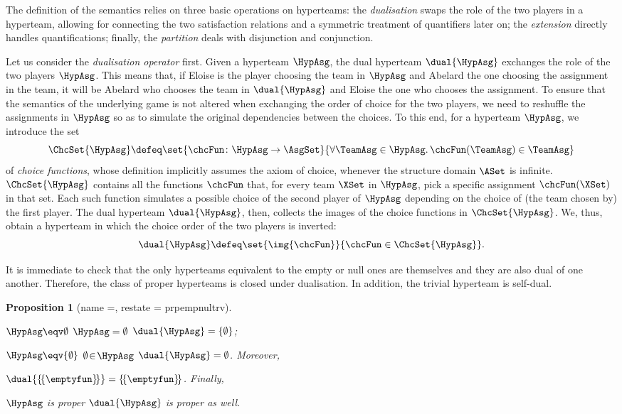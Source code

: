 \documentclass[authoryear]{elsarticle}
\newtheorem{proposition}{Proposition}
\newcommand{\EmpTeamAsg}{\emptyset}
\newcommand{\EmpHypAsg}{\emptyset}
\newcommand{\NulHypAsg}{\{\emptyset\}}
\newcommand{\TrvHypAsg}{\{\!\{\emptyfun\}\!\}}
\begin{document}
The definition of the semantics relies on three basic operations on hyperteams:
the \emph{dualisation} swaps the role of the two players in a hyperteam,
allowing for connecting the two satisfaction relations and a symmetric treatment
of quantifiers later on; the \emph{extension} directly handles quantifications;
finally, the \emph{partition} deals with disjunction and conjunction.

Let us consider the \emph{dualisation operator} first.
%
Given a hyperteam $\HypAsg$, the dual hyperteam $\dual{\HypAsg}$ exchanges the
role of the two players \wrt $\HypAsg$.
This means that, if Eloise is the player choosing the team in $\HypAsg$ and
Abelard the one choosing the assignment in the team, it will be Abelard who
chooses the team in $\dual{\HypAsg}$ and Eloise the one who chooses the
assignment.
%
To ensure that the semantics of the underlying game is not altered when
exchanging the order of choice for the two players, we need to reshuffle the
assignments in $\HypAsg$ so as to simulate the original dependencies between the
choices.
To this end, for a hyperteam $\HypAsg$, we introduce the set
\[
  \ChcSet{\HypAsg} \defeq \set{ \chcFun \colon \HypAsg \to \AsgSet }{ \forall
  \TeamAsg \in \HypAsg \ldotp \chcFun(\TeamAsg) \in \TeamAsg }
\]
of \emph{choice functions}, whose definition implicitly assumes the axiom of
choice, whenever the structure domain $\ASet$ is infinite.
$\ChcSet{\HypAsg}$ contains all the functions $\chcFun$ that, for every team
$\XSet$ in $\HypAsg$, pick a specific assignment $\chcFun(\XSet)$ in that set.
Each such function simulates a possible choice of the second player of $\HypAsg$
depending on the choice of (the team chosen by) the first player.
The dual hyperteam $\dual{\HypAsg}$, then, collects the images of the choice
functions in $\ChcSet{\HypAsg}$.
%
We, thus, obtain a hyperteam in which the choice order of the two players is
inverted:
\[
  \dual{\HypAsg} \defeq \set{ \img{\chcFun} }{ \chcFun \in \ChcSet{\HypAsg} }.
\]

It is immediate to check that the only hyperteams equivalent to the empty or
null ones are themselves and they are also dual of one another.
Therefore, the class of proper hyperteams is closed under dualisation.
In addition, the trivial hyperteam is self-dual.

\begin{proposition}[name =, restate = prpempnultrv]
  \label{prp:empnultrv}
  \begin{inparaenum}[1)]
    \item
      $\HypAsg \eqv \EmpHypAsg$ \iff $\HypAsg = \EmpHypAsg$ \iff $\dual{\HypAsg}
      = \NulHypAsg$;
    \item
      $\HypAsg \eqv \NulHypAsg$ \iff $\EmpTeamAsg \!\in\! \HypAsg$ \iff
      $\dual{\HypAsg} = \EmpHypAsg$.
      Moreover,
    \item
      $\dual{\TrvHypAsg} = \TrvHypAsg$.
      Finally,
    \item
      $\HypAsg$ is proper \iff $\dual{\HypAsg}$ is proper as well.
  \end{inparaenum}
\end{proposition}
\end{document}
